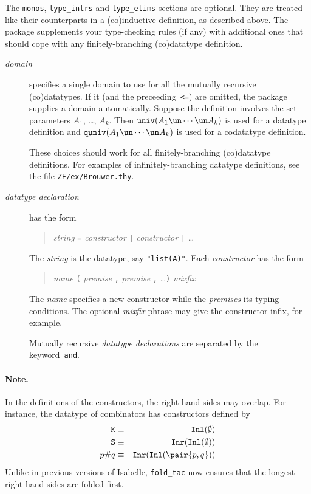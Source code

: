 The {\tt monos}, {\tt type\_intrs} and {\tt type\_elims} sections are
optional.  They are treated like their counterparts in a (co)inductive
definition, as described above.  The package supplements your type-checking
rules (if any) with additional ones that should cope with any
finitely-branching (co)datatype definition.

\begin{description}
\item[\it domain] specifies a single domain to use for all the mutually
  recursive (co)datatypes.  If it (and the preceeding~{\tt <=}) are
  omitted, the package supplies a domain automatically.  Suppose the
  definition involves the set parameters $A_1$, \ldots, $A_k$.  Then
  $\univ(A_1\un\cdots\un A_k)$ is used for a datatype definition and
  $\quniv(A_1\un\cdots\un A_k)$ is used for a codatatype definition.

  These choices should work for all finitely-branching (co)datatype
  definitions.  For examples of infinitely-branching datatype
  definitions, see the file {\tt ZF/ex/Brouwer.thy}.

\item[\it datatype declaration] has the form
\begin{quote}
 {\it string\/} {\tt =} {\it constructor} {\tt|} {\it constructor} {\tt|}
 \ldots 
\end{quote}
The {\it string\/} is the datatype, say {\tt"list(A)"}.  Each
{\it constructor\/} has the form 
\begin{quote}
 {\it name\/} {\tt(} {\it premise} {\tt,} {\it premise} {\tt,} \ldots {\tt)}
 {\it mixfix\/}
\end{quote}
The {\it name\/} specifies a new constructor while the {\it premises\/} its
typing conditions.  The optional {\it mixfix\/} phrase may give
the constructor infix, for example.

Mutually recursive {\it datatype declarations\/} are separated by the
keyword~{\tt and}.
\end{description}

\paragraph*{Note.}
In the definitions of the constructors, the right-hand sides may overlap.
For instance, the datatype of combinators has constructors defined by
\begin{eqnarray*}
  {\tt K} & \equiv & \Inl(\emptyset) \\
  {\tt S} & \equiv & \Inr(\Inl(\emptyset)) \\
  p{\tt\#}q & \equiv & \Inr(\Inl(\pair{p,q})) 
\end{eqnarray*}
Unlike in previous versions of Isabelle, \verb|fold_tac| now ensures that the
longest right-hand sides are folded first.

\fi

